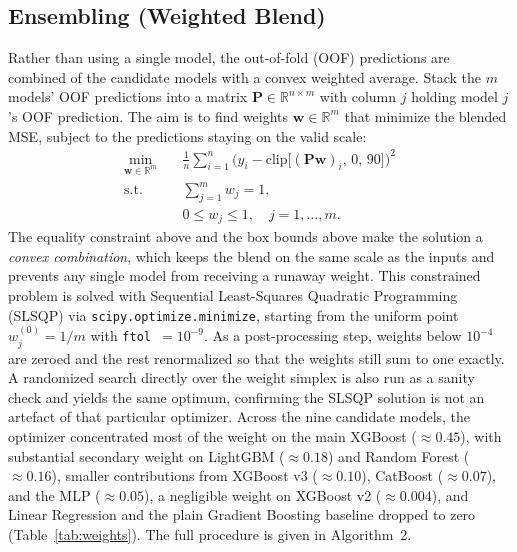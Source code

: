 \documentclass[journal]{IEEEtran}
\begin{document}
\subsection{Ensembling (Weighted Blend)}
\label{sec:blend}
Rather than using a single model, the out-of-fold (OOF) predictions are combined
of the candidate models with a convex weighted average. Stack the $m$ models'
OOF predictions into a matrix $\mathbf{P}\in\mathbb{R}^{n\times m}$ with column
$j$ holding model $j$'s OOF prediction. The aim is to find weights
$\mathbf{w}\in\mathbb{R}^{m}$ that minimize the blended MSE, subject to the
predictions staying on the valid scale:
\begin{align}
\min_{\mathbf{w}\in\mathbb{R}^{m}}\quad
& \frac{1}{n}\sum_{i=1}^{n}\Big(y_i-\mathrm{clip}\big[(\mathbf{P}\mathbf{w})_i,\,0,\,90\big]\Big)^{2}
\label{eq:blendobj}\\
\text{s.t.}\quad & \sum_{j=1}^{m}w_j = 1,
\label{eq:blendeq}\\
& 0 \le w_j \le 1,\quad j=1,\dots,m.
\label{eq:blendbox}
\end{align}
The equality constraint above and the box
bounds above make the solution a \emph{convex combination}, which
keeps the blend on the same scale as the inputs and prevents any single model
from receiving a runaway weight. This constrained problem is solved
with Sequential Least-Squares Quadratic Programming (SLSQP) via
\texttt{scipy.optimize.minimize}, starting from the uniform point
$w_j^{(0)}=1/m$ with \texttt{ftol}~$=10^{-9}$. As a post-processing step, weights below $10^{-4}$
are zeroed and the rest renormalized so that
the weights still sum to one exactly. A randomized search directly over the
weight simplex is also run as a sanity check and yields the same optimum,
confirming the SLSQP solution is not an artefact of that particular optimizer.
Across the nine candidate models, the optimizer concentrated most of the
weight on the main XGBoost ($\approx0.45$), with substantial secondary weight
on LightGBM ($\approx0.18$) and Random Forest ($\approx0.16$), smaller
contributions from XGBoost v3 ($\approx0.10$), CatBoost ($\approx0.07$), and
the MLP ($\approx0.05$), a negligible weight on XGBoost v2 ($\approx0.004$),
and Linear Regression and the plain Gradient Boosting baseline dropped to zero
(Table~\ref{tab:weights}). The full procedure is given in Algorithm~2.
\end{document}
